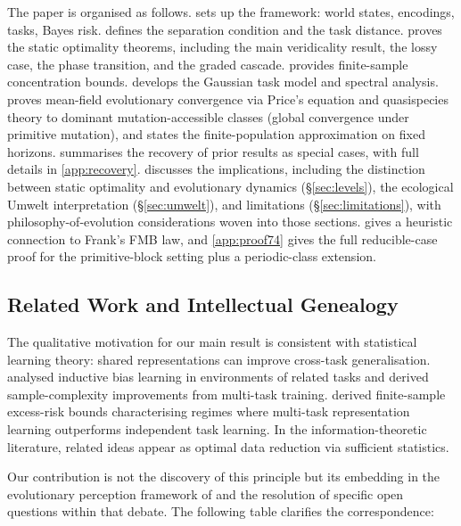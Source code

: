 \documentclass[12pt]{article}
\begin{document}
The paper is organised as follows.  sets up the framework: world states, encodings, tasks, Bayes risk.  defines the separation condition and the task distance.  proves the static optimality theorems, including the main veridicality result, the lossy case, the phase transition, and the graded cascade.  provides finite-sample concentration bounds.  develops the Gaussian task model and spectral analysis.  proves mean-field evolutionary convergence via Price's equation and quasispecies theory to dominant mutation-accessible classes (global convergence under primitive mutation), and states the finite-population approximation on fixed horizons.  summarises the recovery of prior results as special cases, with full details in \cref{app:recovery}.  discusses the implications, including the distinction between static optimality and evolutionary dynamics (\S\ref{sec:levels}), the ecological Umwelt interpretation (\S\ref{sec:umwelt}), and limitations (\S\ref{sec:limitations}), with philosophy-of-evolution considerations woven into those sections.  gives a heuristic connection to Frank's FMB law, and \cref{app:proof74} gives the full reducible-case proof for the primitive-block setting plus a periodic-class extension.

\subsection{Related Work and Intellectual Genealogy}\label{sec:related}

The qualitative motivation for our main result is consistent with statistical learning theory: shared representations can improve cross-task generalisation. \citet{baxter_2000} analysed inductive bias learning in environments of related tasks and derived sample-complexity improvements from multi-task training. \citet{maurer_etal_2016} derived finite-sample excess-risk bounds characterising regimes where multi-task representation learning outperforms independent task learning. In the information-theoretic literature, related ideas appear as optimal data reduction via sufficient statistics.

Our contribution is not the discovery of this principle but its embedding in the evolutionary perception framework of \citet{hoffman_etal_2015} and the resolution of specific open questions within that debate. The following table clarifies the correspondence:
\end{document}

